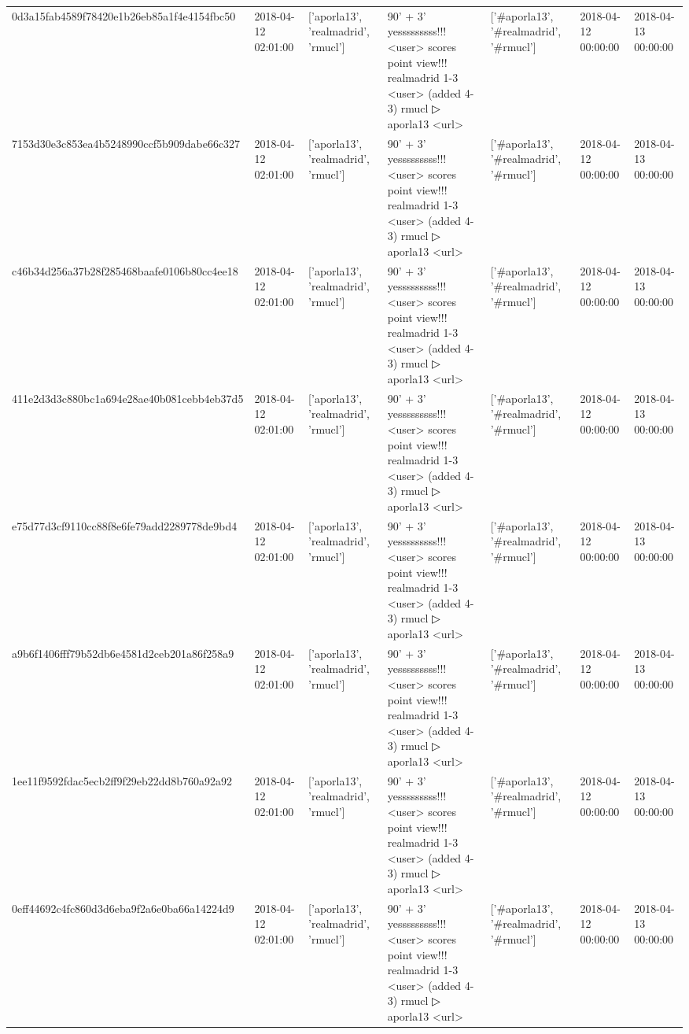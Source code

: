 \begin{tabular}{lllllll}
0d3a15fab4589f78420e1b26eb85a1f4e4154fbc50 & 2018-04-12 02:01:00 & ['aporla13', 'realmadrid', 'rmucl'] & 90' + 3' yesssssssss!!! <user> scores point view!!! realmadrid 1-3 <user> (added 4-3) rmucl ▷ aporla13 <url> & ['#aporla13', '#realmadrid', '#rmucl'] & 2018-04-12 00:00:00 & 2018-04-13 00:00:00 \\
7153d30e3c853ea4b5248990ccf5b909dabe66c327 & 2018-04-12 02:01:00 & ['aporla13', 'realmadrid', 'rmucl'] & 90' + 3' yesssssssss!!! <user> scores point view!!! realmadrid 1-3 <user> (added 4-3) rmucl ▷ aporla13 <url> & ['#aporla13', '#realmadrid', '#rmucl'] & 2018-04-12 00:00:00 & 2018-04-13 00:00:00 \\
c46b34d256a37b28f285468baafe0106b80cc4ee18 & 2018-04-12 02:01:00 & ['aporla13', 'realmadrid', 'rmucl'] & 90' + 3' yesssssssss!!! <user> scores point view!!! realmadrid 1-3 <user> (added 4-3) rmucl ▷ aporla13 <url> & ['#aporla13', '#realmadrid', '#rmucl'] & 2018-04-12 00:00:00 & 2018-04-13 00:00:00 \\
411e2d3d3c880bc1a694e28ae40b081cebb4eb37d5 & 2018-04-12 02:01:00 & ['aporla13', 'realmadrid', 'rmucl'] & 90' + 3' yesssssssss!!! <user> scores point view!!! realmadrid 1-3 <user> (added 4-3) rmucl ▷ aporla13 <url> & ['#aporla13', '#realmadrid', '#rmucl'] & 2018-04-12 00:00:00 & 2018-04-13 00:00:00 \\
e75d77d3cf9110cc88f8e6fe79add2289778de9bd4 & 2018-04-12 02:01:00 & ['aporla13', 'realmadrid', 'rmucl'] & 90' + 3' yesssssssss!!! <user> scores point view!!! realmadrid 1-3 <user> (added 4-3) rmucl ▷ aporla13 <url> & ['#aporla13', '#realmadrid', '#rmucl'] & 2018-04-12 00:00:00 & 2018-04-13 00:00:00 \\
a9b6f1406fff79b52db6e4581d2ceb201a86f258a9 & 2018-04-12 02:01:00 & ['aporla13', 'realmadrid', 'rmucl'] & 90' + 3' yesssssssss!!! <user> scores point view!!! realmadrid 1-3 <user> (added 4-3) rmucl ▷ aporla13 <url> & ['#aporla13', '#realmadrid', '#rmucl'] & 2018-04-12 00:00:00 & 2018-04-13 00:00:00 \\
1ee11f9592fdac5ecb2ff9f29eb22dd8b760a92a92 & 2018-04-12 02:01:00 & ['aporla13', 'realmadrid', 'rmucl'] & 90' + 3' yesssssssss!!! <user> scores point view!!! realmadrid 1-3 <user> (added 4-3) rmucl ▷ aporla13 <url> & ['#aporla13', '#realmadrid', '#rmucl'] & 2018-04-12 00:00:00 & 2018-04-13 00:00:00 \\
0eff44692c4fc860d3d6eba9f2a6e0ba66a14224d9 & 2018-04-12 02:01:00 & ['aporla13', 'realmadrid', 'rmucl'] & 90' + 3' yesssssssss!!! <user> scores point view!!! realmadrid 1-3 <user> (added 4-3) rmucl ▷ aporla13 <url> & ['#aporla13', '#realmadrid', '#rmucl'] & 2018-04-12 00:00:00 & 2018-04-13 00:00:00 \\

\end{tabular}
